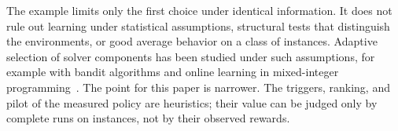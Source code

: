 The example limits only the first choice under identical information. It does
not rule out learning under statistical assumptions, structural tests that
distinguish the environments, or good average behavior on a class of
instances. Adaptive selection of solver components has been studied under such
assumptions, for example with bandit algorithms and online learning in
mixed-integer programming~\cite{hendel2018adaptive,chmiela2023scheduling}.
The point for this
paper is narrower. The triggers, ranking, and pilot of the measured policy are
heuristics; their value can be judged only by complete runs on instances, not
by their observed rewards.
